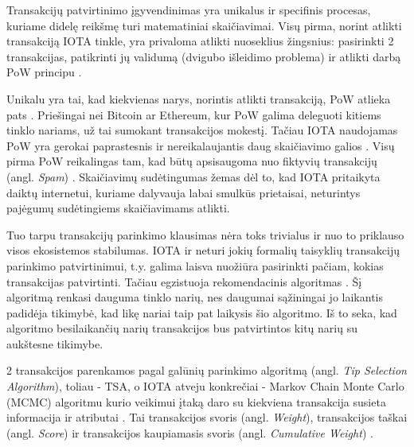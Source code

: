 Transakcijų patvirtinimo įgyvendinimas yra unikalus ir specifinis procesas, kuriame didelę reikšmę turi matematiniai skaičiavimai. Visų pirma, norint atlikti transakciją IOTA tinkle, yra privaloma atlikti nuoseklius žingsnius: pasirinkti 2 transakcijas, patikrinti jų validumą (dvigubo išleidimo problema) ir atlikti darbą PoW principu \cite{popov2016tangle}. 

Unikalu yra tai, kad kiekvienas narys, norintis atlikti transakciją, PoW atlieka pats \cite{bramas2018stability}. Priešingai nei Bitcoin ar Ethereum, kur PoW galima deleguoti kitiems tinklo nariams, už tai sumokant transakcijos mokestį. Tačiau IOTA naudojamas PoW yra gerokai paprastesnis ir nereikalaujantis daug skaičiavimo galios \cite{popov2016tangle}. Visų pirma PoW reikalingas tam, kad būtų apsisaugoma nuo fiktyvių transakcijų (angl. \textit{Spam}) \cite{popov2016tangle}. Skaičiavimų sudėtingumas žemas dėl to, kad IOTA pritaikyta daiktų internetui, kuriame dalyvauja labai smulkūs prietaisai, neturintys pajėgumų sudėtingiems skaičiavimams atlikti.

Tuo tarpu transakcijų parinkimo klausimas nėra toks trivialus ir nuo to priklauso visos ekosistemos stabilumas. IOTA ir neturi jokių formalių taisyklių transakcijų parinkimo patvirtinimui, t.y. galima laisva nuožiūra pasirinkti pačiam, kokias transakcijas patvirtinti. Tačiau egzistuoja rekomendacinis algoritmas \cite{popov2016tangle}. Šį algoritmą renkasi dauguma tinklo narių, nes daugumai sąžiningai jo laikantis padidėja tikimybė, kad likę nariai taip pat laikysis šio algoritmo. Iš to seka, kad algoritmo besilaikančių narių transakcijos bus patvirtintos kitų narių su aukštesne tikimybe.

2 transakcijos parenkamos pagal galūnių parinkimo algoritmą (angl. \textit{Tip Selection Algorithm}), toliau - TSA, o IOTA atveju konkrečiai - Markov Chain Monte Carlo (MCMC) algoritmu kurio veikimui įtaką daro su kiekviena transakcija susieta informacija ir atributai \cite{bramas2018stability}. Tai transakcijos svoris (angl. \textit{Weight}), transakcijos taškai (angl. \textit{Score}) ir transakcijos kaupiamasis svoris (angl. \textit{Cumulative Weight}) \cite{popov2016tangle}. 





